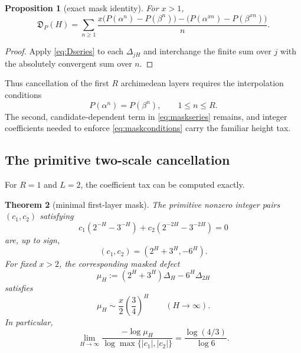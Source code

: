 \documentclass[11pt]{article}
\numberwithin{equation}{section}
\newtheorem{theorem}{Theorem}[section]
\newtheorem{proposition}[theorem]{Proposition}
\theoremstyle{definition}
\theoremstyle{remark}
\begin{document}
\begin{proposition}[exact mask identity]\label{prop:maskidentity}
For $x>1$,
\begin{equation}\label{eq:maskseries}
  \mathfrak D_P(H)
  =\sum_{n\ge1}\frac{
  x\bigl(P(\alpha^n)-P(\beta^n)\bigr)
  -\bigl(P(\alpha^{xn})-P(\beta^{xn})\bigr)}{n}.
\end{equation}
\end{proposition}

\begin{proof}
Apply \eqref{eq:Dseries} to each $\Delta_{jH}$ and interchange the finite sum over $j$ with the absolutely convergent sum over $n$.
\end{proof}

Thus cancellation of the first $R$ archimedean layers requires the interpolation conditions
\begin{equation}\label{eq:maskconditions}
  P(\alpha^n)=P(\beta^n),
  \qquad 1\le n\le R.
\end{equation}
The second, candidate-dependent term in \eqref{eq:maskseries} remains, and integer coefficients needed to enforce \eqref{eq:maskconditions} carry the familiar height tax.

\subsection{The primitive two-scale cancellation}

For $R=1$ and $L=2$, the coefficient tax can be computed exactly.

\begin{theorem}[minimal first-layer mask]\label{thm:firstmask}
The primitive nonzero integer pairs $(c_1,c_2)$ satisfying
\begin{equation}\label{eq:firstcondition}
  c_1(2^{-H}-3^{-H})
  +c_2(2^{-2H}-3^{-2H})=0
\end{equation}
are, up to sign,
\begin{equation}\label{eq:firstcoeffs}
  (c_1,c_2)=(2^H+3^H,-6^H).
\end{equation}
For fixed $x>2$, the corresponding masked defect
\begin{equation}\label{eq:muH}
  \mu_H:=(2^H+3^H)\Delta_H-6^H\Delta_{2H}
\end{equation}
satisfies
\begin{equation}\label{eq:muasymp}
  \mu_H\sim \frac{x}{2}\left(\frac34\right)^H
  \qquad(H\to\infty).
\end{equation}
In particular,
\begin{equation}\label{eq:masktaxratio}
  \lim_{H\to\infty}
  \frac{-\log\mu_H}{\log\max\{|c_1|,|c_2|\}}
  =\frac{\log(4/3)}{\log6}.
\end{equation}
\end{theorem}
\end{document}
